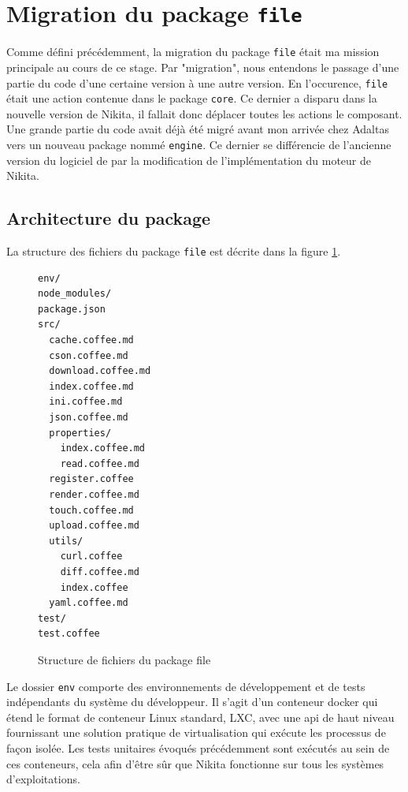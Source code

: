 \documentclass[12pt, french]{report}
\begin{document}
\section{Migration du package \texttt{file}}

Comme défini précédemment, la migration du package \texttt{file} était ma mission principale au cours de ce stage. Par "migration", nous entendons le passage d'une partie du code d'une certaine version à une autre version. En l'occurence, \texttt{file} était une action contenue dans le package \texttt{core}. Ce dernier a disparu dans la nouvelle version de Nikita, il fallait donc déplacer toutes les actions le composant. Une grande partie du code avait déjà été migré avant mon arrivée chez Adaltas vers un nouveau package nommé \texttt{engine}. Ce dernier se différencie de l'ancienne version du logiciel de par la modification de l'implémentation du moteur de Nikita.

\subsection{Architecture du package}

La structure des fichiers du package \texttt{file} est décrite dans la figure \ref{fig:fileStructure}.

\begin{figure}[h]
\begin{verbatim}
env/
node_modules/
package.json
src/
  cache.coffee.md
  cson.coffee.md
  download.coffee.md
  index.coffee.md
  ini.coffee.md
  json.coffee.md
  properties/
    index.coffee.md
    read.coffee.md
  register.coffee
  render.coffee.md
  touch.coffee.md
  upload.coffee.md
  utils/
    curl.coffee
    diff.coffee.md
    index.coffee
  yaml.coffee.md
test/
test.coffee
\end{verbatim}
\centering
\caption{Structure de fichiers du package file}
\label{fig:fileStructure}
\end{figure}

Le dossier \texttt{env} comporte des environnements de développement et de tests indépendants du système du développeur. Il s'agit d'un conteneur \gls{docker} qui étend le format de conteneur Linux standard, LXC, avec une \gls{api} de haut niveau fournissant une solution pratique de virtualisation qui exécute les processus de façon isolée. Les tests unitaires évoqués précédemment sont exécutés au sein de ces conteneurs, cela afin d'être sûr que Nikita fonctionne sur tous les systèmes d'exploitations.
\end{document}
